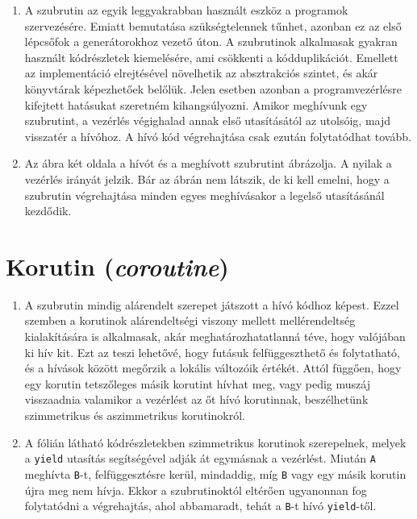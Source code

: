 \documentclass[12pt, a4paper]{article}
\begin{document}
\begin{enumerate}
\item
A szubrutin az egyik leggyakrabban használt eszköz a programok szervezésére. Emiatt bemutatása szükségtelennek tűnhet, azonban ez az első lépcsőfok a generátorokhoz vezető úton. A szubrutinok alkalmasak gyakran használt kódrészletek kiemelésére, ami csökkenti a kódduplikációt. Emellett az implementáció elrejtésével növelhetik az absztrakciós szintet, és akár könyvtárak képezhetőek belőlük. Jelen esetben azonban a programvezérlésre kifejtett hatásukat szeretném kihangsúlyozni. Amikor meghívunk egy szubrutint, a vezérlés végighalad annak első utasításától az utolsóig, majd visszatér a hívóhoz. A hívó kód végrehajtása csak ezután folytatódhat tovább.
\item
Az ábra két oldala a hívót és a meghívott szubrutint ábrázolja. A nyilak a vezérlés irányát jelzik. Bár az ábrán nem látszik, de ki kell emelni, hogy a szubrutin végrehajtása minden egyes meghívásakor a legelső utasításánál kezdődik.
\end{enumerate}

\section{Korutin (\textit{coroutine})}

\begin{enumerate}
\item
A szubrutin mindig alárendelt szerepet játszott a hívó kódhoz képest. Ezzel szemben a korutinok alárendeltségi viszony mellett mellérendeltség kialakítására is alkalmasak, akár meghatározhatatlanná téve, hogy valójában ki hív kit. Ezt az teszi lehetővé, hogy futásuk felfüggeszthető és folytatható, és a hívások között megőrzik a lokális változóik értékét. Attól függően, hogy egy korutin tetszőleges másik korutint hívhat meg, vagy pedig muszáj visszaadnia valamikor a vezérlést az őt hívó korutinnak, beszélhetünk szimmetrikus és aszimmetrikus korutinokról.
\item
A fólián látható kódrészletekben szimmetrikus korutinok szerepelnek, melyek a \texttt{yield} utasítás segítségével adják át egymásnak a vezérlést. Miután \texttt{A} meghívta \texttt{B}-t, felfüggesztésre kerül, mindaddig, míg \texttt{B} vagy egy másik korutin újra meg nem hívja. Ekkor a szubrutinoktól eltérően ugyanonnan fog folytatódni a végrehajtás, ahol abbamaradt, tehát a \texttt{B}-t hívó \texttt{yield}-től.
\end{enumerate}
\end{document}
